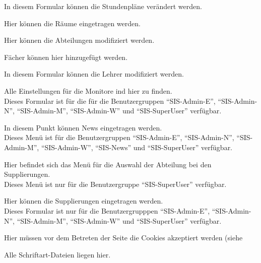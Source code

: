 \begin{description}[style=nextline]
\begin{description}[style=nextline]
\begin{description}[style=nextline]
						\item[./lessons/]
							In diesem Formular können die Stundenpläne verändert werden.
						\item[./rooms/]
							Hier können die Räume eingetragen werden.
						\item[./sections/]
							Hier können die Abteilungen modifiziert werden.
						\item[./subjects/]
							Fächer können hier hinzugefügt werden.
						\item[./teachers/]
							In diesem Formular können die Lehrer modifiziert werden.
					\end{description}
				\item[./monitors/]
					Alle Einstellungen für die Monitore ind hier zu finden.\\
					Dieses Formular ist für die für die Benutzergruppen \enquote{SIS-Admin-E}, \enquote{SIS-Admin-N}, \enquote{SIS-Admin-M}, \enquote{SIS-Admin-W} und \enquote{SIS-SuperUser} verfügbar.
				\item[./news/]
					In diesem Punkt können News eingetragen werden.\\
					Dieses Menü ist für die Benutzergruppen \enquote{SIS-Admin-E}, \enquote{SIS-Admin-N}, \enquote{SIS-Admin-M}, \enquote{SIS-Admin-W}, \enquote{SIS-News} und \enquote{SIS-SuperUser} verfügbar.
				\item[./substitudes/]
					Hier befindet sich das Menü für die Auswahl der Abteilung bei den Supplierungen.\\
					Dieses Menü ist nur für die Benutzergruppe \enquote{SIS-SuperUser} verfügbar.
					\begin{description}[style=nextline]
						\item[./form/]
							Hier können die Supplierungen eingetragen werden.\\
							Dieses Formular ist nur für die Benutzergrupppen \enquote{SIS-Admin-E}, \enquote{SIS-Admin-N}, \enquote{SIS-Admin-M}, \enquote{SIS-Admin-W} und \enquote{SIS-SuperUser} verfügbar.
					\end{description}
		\end{description}	
	\item[/cookies/]
			Hier müssen vor dem Betreten der Seite die Cookies akzeptiert werden (siehe %
		\item[/data/]
			\begin{description}[style=nextline]
				\item[./fonts/]
					Alle Schriftart-Dateien liegen hier.

\end{description}
\end{description}

